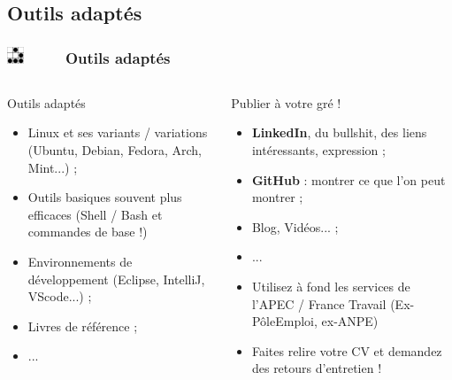 \documentclass[slidetop,11pt]{beamer}
\def\sectionPartVb{Outils adapt{\'e}s}
\def\moreInFrameTitle{\includegraphics[height=0.5cm]{img/logo_glider.png}~~~~~}
\begin{document}
\subsection{\sectionPartVb}
\begin{frame}
	\frametitle{\moreInFrameTitle \sectionPartVb}
	\begin{columns}[T]
	\begin{column}[T]{5.50cm}
		\begin{beamerboxesrounded}	[lower=substructureDE, %
		 				 upper=block title DE,%
						 shadow=true]%
		       {\sectionPartVb}
			\begin{itemize}
				\item Linux et ses variants / variations (Ubuntu, Debian, Fedora, Arch, Mint...) ; 
				\item Outils basiques souvent plus efficaces (Shell / Bash et commandes de base !)
				\item Environnements de d{\'e}veloppement (Eclipse, IntelliJ, VScode...) ; 
				\item Livres de r{\'e}f{\'e}rence ; 
				\item ... 
			\end{itemize}
		\end{beamerboxesrounded}
	\end{column}
	\begin{column}[T]{5.50cm}
		\begin{beamerboxesrounded}	[lower=substructureUN, %
		 				 upper=block title UN,%
						 shadow=true]%
		       {Publier {\`a} votre gr{\'e} !}
			\begin{itemize}
				\item \textbf{LinkedIn}, du bullshit, des liens int{\'e}ressants, expression ; 
				\item \textbf{GitHub} : montrer ce que l'on peut montrer ; 
				\item Blog, Vid{\'e}os... ; 
				\item ... 
				\item Utilisez {\`a} fond les services de l'APEC / France Travail (Ex-P{\^o}leEmploi, ex-ANPE)
				\item Faites relire votre CV et demandez des retours d'entretien !
			\end{itemize}
		\end{beamerboxesrounded}
	\end{column}
	\end{columns}
\end{frame}
\end{document}
